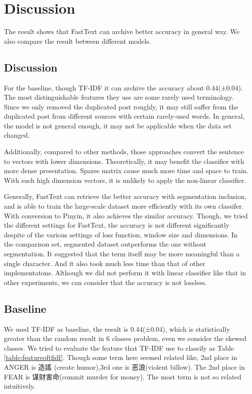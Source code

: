 \chapter{Discussion}

The result shows that FastText can archive better accuracy in general way. We also compare the result between different models.

\section{Discussion}


For the baseline, though TF-IDF it can archive the accuracy about 0.44(±0.04). 
The most distinguishable features they use are some rarely used terminology. 
Since we only removed the duplicated post roughly, it may still suffer from the duplicated post from different sources with certain rarely-used words. 
In general, the model is not general enough, it may not be applicable when the data set changed. 

Additionally, compared to other methods, those approaches convert the sentence to vectors with lower dimensions.
Theoretically, it may benefit the classifier with more dense presentation. Sparse matrix cause much more time and space to train.
With such high dimension vectors, it is unlikely to apply the non-linear classifier.

Generally, FastText can retrieve the better accuracy with segmentation inclusion, and is able to train the large-scale dataset more efficiently with its own classifer.
With conversion to Pinyin, it also achieves the similar accuracy. Though, we tried the different settings for FastText,
the accuracy is not different significantly despite of the various settings of loss function, window size and dimensions. 
In the comparison set, segmented dataset outperforms the one without segmentation. 
It suggested that the term itself may be more meaningful than a single character. And it also took much less time than that of other implementatons.
Although we did not perform it with linear classifier like that in other experiments, we can consider that the accuracy is not lossless.

\section{Baseline}

We used TF-IDF as baseline, the result is 0.44(±0.04), which is statistically greater than the random result in 6 classes problem, 
even we consider the skewed classes.  We tried to evaluate the feature that TF-IDF use to classify as Table \ref{table:featureoftfidf}. 
Though some term here seemed related like, 2nd place in ANGER is 造謠 (create humor),3rd one is 恶浪(violent billow). 
The 2nd place in FEAR is 谋财害命(commit murder for money). The most term is not so related intuitively. 

